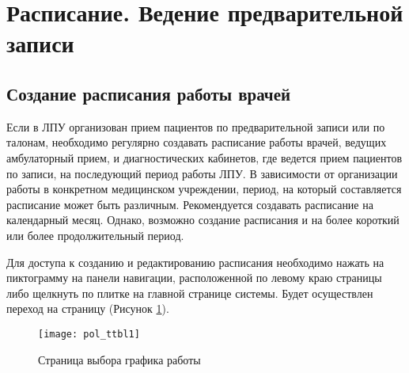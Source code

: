 \newpage
\section{Расписание. Ведение предварительной записи}

{
\subsection{Создание расписания работы врачей} \label{pol_ttbl_new}

Если в ЛПУ организован прием пациентов по предварительной записи или по талонам, необходимо регулярно создавать расписание работы врачей, ведущих амбулаторный прием, и диагностических кабинетов, где ведется прием пациентов по записи,  на последующий период работы ЛПУ. В зависимости от организации работы в конкретном медицинском учреждении, период, на который составляется расписание может быть различным. Рекомендуется создавать расписание на календарный месяц. Однако, возможно создание расписания и на более короткий или более продолжительный период.

Для доступа к созданию и редактированию расписания необходимо нажать на пиктограмму  на панели навигации, расположенной по левому краю страницы либо щелкнуть по  плитке  на главной странице системы. Будет осуществлен переход на страницу  (Рисунок \ref{img_pol_ttbl1}).
}{}

\begin{figure}[ht]\centering
 \texttt{[image: pol\_ttbl1]}
 \caption{Страница выбора графика работы}
 \label{img_pol_ttbl1}
\end{figure}

